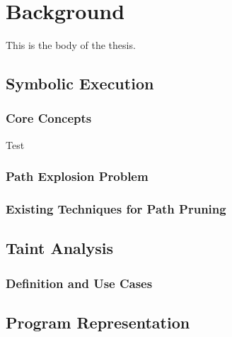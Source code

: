 \chapter{Background}

This is the body of the thesis.

\section{Symbolic Execution}

\subsection{Core Concepts}

Test

\subsection{Path Explosion Problem}

\subsection{Existing Techniques for Path Pruning}

\section{Taint Analysis}

\subsection{Definition and Use Cases}

\section{Program Representation}
